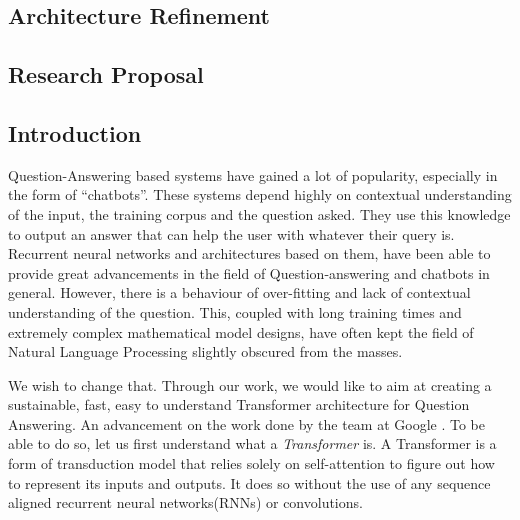 \documentclass[12pt]{report}
\begin{document}
    \section{Architecture Refinement}\label{c43}
    \begin{appendices}
        \chapter{Research Proposal}\label{rp}
        	\section{Introduction}\label{introduction}

        Question-Answering based systems have gained a lot of popularity, especially in the form of ``chatbots''. These systems depend highly on contextual understanding of the input, the training corpus and the question asked. They use this knowledge to output an answer that can help the user with whatever their query is. Recurrent neural networks and architectures based on them, have been able to provide great advancements in the field of Question-answering and chatbots in general. However, there is a behaviour of over-fitting and lack of contextual understanding of the question. This, coupled with long training times and extremely complex mathematical model designs, have often kept the field of Natural Language Processing slightly obscured from the masses.

        We wish to change that. Through our work, we would like to aim at creating a sustainable, fast, easy to understand Transformer architecture for Question Answering. An advancement on the work done by the team at Google \citep{atayl}. To be able to do so, let us first understand what a \textit{Transformer} is.
        A Transformer is a form of transduction model that relies solely on self-attention to figure out how to represent its inputs and outputs. It does so without the use of any sequence aligned recurrent neural networks(RNNs) or convolutions.


\end{appendices}
\end{document}
